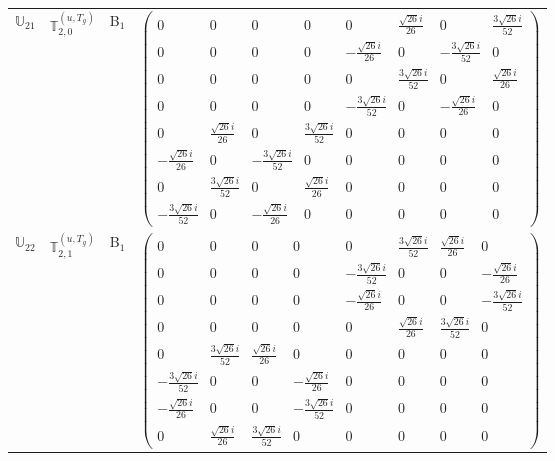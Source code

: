 \documentclass[fleqn,10pt,landscape]{article}
\begin{document}
\begin{itemize}
\begin{center}
\begin{longtable}{c|c|c|c}
$ \mathbb{U}_{21} $ & $\mathbb{T}_{2,0}^{(u,T_{g})}$ & B$_{1}$ & $\begin{pmatrix} 0 & 0 & 0 & 0 & 0 & \frac{\sqrt{26} i}{26} & 0 & \frac{3 \sqrt{26} i}{52} \\ 0 & 0 & 0 & 0 & - \frac{\sqrt{26} i}{26} & 0 & - \frac{3 \sqrt{26} i}{52} & 0 \\ 0 & 0 & 0 & 0 & 0 & \frac{3 \sqrt{26} i}{52} & 0 & \frac{\sqrt{26} i}{26} \\ 0 & 0 & 0 & 0 & - \frac{3 \sqrt{26} i}{52} & 0 & - \frac{\sqrt{26} i}{26} & 0 \\ 0 & \frac{\sqrt{26} i}{26} & 0 & \frac{3 \sqrt{26} i}{52} & 0 & 0 & 0 & 0 \\ - \frac{\sqrt{26} i}{26} & 0 & - \frac{3 \sqrt{26} i}{52} & 0 & 0 & 0 & 0 & 0 \\ 0 & \frac{3 \sqrt{26} i}{52} & 0 & \frac{\sqrt{26} i}{26} & 0 & 0 & 0 & 0 \\ - \frac{3 \sqrt{26} i}{52} & 0 & - \frac{\sqrt{26} i}{26} & 0 & 0 & 0 & 0 & 0 \end{pmatrix}$ \\
$ \mathbb{U}_{22} $ & $\mathbb{T}_{2,1}^{(u,T_{g})}$ & B$_{1}$ & $\begin{pmatrix} 0 & 0 & 0 & 0 & 0 & \frac{3 \sqrt{26} i}{52} & \frac{\sqrt{26} i}{26} & 0 \\ 0 & 0 & 0 & 0 & - \frac{3 \sqrt{26} i}{52} & 0 & 0 & - \frac{\sqrt{26} i}{26} \\ 0 & 0 & 0 & 0 & - \frac{\sqrt{26} i}{26} & 0 & 0 & - \frac{3 \sqrt{26} i}{52} \\ 0 & 0 & 0 & 0 & 0 & \frac{\sqrt{26} i}{26} & \frac{3 \sqrt{26} i}{52} & 0 \\ 0 & \frac{3 \sqrt{26} i}{52} & \frac{\sqrt{26} i}{26} & 0 & 0 & 0 & 0 & 0 \\ - \frac{3 \sqrt{26} i}{52} & 0 & 0 & - \frac{\sqrt{26} i}{26} & 0 & 0 & 0 & 0 \\ - \frac{\sqrt{26} i}{26} & 0 & 0 & - \frac{3 \sqrt{26} i}{52} & 0 & 0 & 0 & 0 \\ 0 & \frac{\sqrt{26} i}{26} & \frac{3 \sqrt{26} i}{52} & 0 & 0 & 0 & 0 & 0 \end{pmatrix}$ \\

\end{longtable}
\end{center}
\end{itemize}
\end{document}
